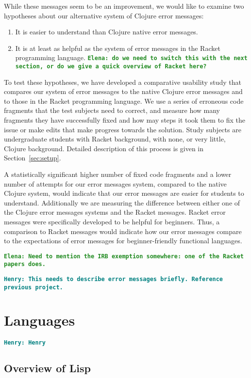 \documentclass[12pt]{article}
\newcommand{\comment}[1]{{\bf \tt  {#1}}}
\newcommand{\emcomment}[1]{\textcolor{ForestGreen}{\comment{Elena: {#1}}}}
\newcommand{\hfcomment}[1]{\textcolor{Teal}{\comment{Henry: {#1}}}}
\begin{document}
While these messages seem to be an improvement, we would like to examine two hypotheses about our alternative system of Clojure error messages:
\begin{enumerate}
\item It is easier to understand than Clojure native error messages.
\item It is at least as helpful as the system of error messages in the Racket programming language. \emcomment{do we need to switch this with the next section, or do we give a quick overview of Racket here?}
\end{enumerate}
To test these hypotheses, we have developed a comparative usability study that compares our system of error messages to the native Clojure error messages and to those in the Racket programming language. We use a series of erroneous code fragments that the test subjects need to correct, and measure how many fragments they have successfully fixed and how may steps it took them to fix the issue or make edits that make progress towards the solution. 
Study subjects are undergraduate students with Racket background, with none, or very little, Clojure background. 
Detailed description of this process is given in Section~\ref{sec:setup}. 

A statistically significant higher number of fixed code fragments and a lower number of attempts for our error messages system, compared to the native Clojure system, would indicate that our error messages are easier for students to understand. Additionally we are measuring the difference between either one of the Clojure error messages systems and the Racket messages. Racket error messages were specifically developed to be helpful for beginners. Thus, a comparison to Racket messages would indicate how our error messages compare to the expectations of error messages for beginner-friendly functional languages. 

\emcomment{Need to mention the IRB exemption somewhere: one of the Racket papers does.}


	\hfcomment{This needs to describe error messages briefly. Reference previous project.}
\section{Languages}\label{sec:lang}
	\hfcomment{Henry}

	\subsection{Overview of Lisp}\label{sec:lisp}
\end{document}
